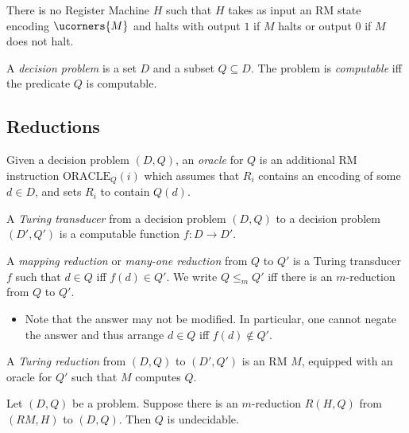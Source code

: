 \documentclass{article}
\begin{document}
\begin{theorem*}
	There is no Register Machine $H$ such that $H$ takes as input an RM state encoding
	$\ucorners{M}$ and halts with output $1$ if $M$ halts or output $0$ if $M$ does not halt.
\end{theorem*}


\begin{definition*}
	A \emph{decision problem} is a set $D$ and a subset $Q\subseteq D$.
	The problem is \emph{computable} iff the predicate $Q$ is computable.
\end{definition*}

\subsection{Reductions}

\begin{definition*}[Oracle]
	Given a decision problem $(D,Q)$, an \emph{oracle} for $Q$ is an additional
	RM instruction $\text{ORACLE}_Q(i)$ which assumes that $R_i$ contains an
	encoding of some $d\in D$, and sets $R_i$ to contain $Q(d)$.
\end{definition*}

\begin{definition*}
	A \emph{Turing transducer} from a decision problem $(D,Q)$ to a decision problem
	$(D',Q')$ is a computable function $f:D\to D'$.
\end{definition*}

\begin{definition*}[m-reduction]
	A \emph{mapping reduction} or \emph{many-one reduction} from $Q$ to $Q'$ is a
	Turing transducer $f$ such that $d\in Q$ iff $f(d)\in Q'$. We write $Q\leq_m Q'$
	iff there is an $m$-reduction from $Q$ to $Q'$.
	\begin{itemize}
		\item Note that the answer may not be modified. In particular, one cannot negate
		      the answer and thus arrange $d\in Q$ iff $f(d)\not\in Q'$.
	\end{itemize}
\end{definition*}

\begin{definition*}
	A \emph{Turing reduction} from $(D,Q)$ to $(D',Q')$ is an RM $M$, equipped with
	an oracle for $Q'$ such that $M$ computes $Q$.
\end{definition*}

\begin{theorem*}[Notes I.15]
	Let $(D,Q)$ be a problem. Suppose there is an $m$-reduction $R(H,Q)$ from
	$(RM, H)$ to $(D,Q)$. Then $Q$ is undecidable.
\end{theorem*}
\end{document}
